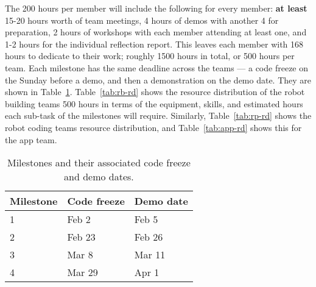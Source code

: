 \documentclass{article}
\begin{document}
The 200 hours per member will include the following for every member: {\bf at least} 15-20 hours worth of team meetings, 4 hours of demos with another 4 for preparation, 2 hours of workshops with each member attending at least one, and 1-2 hours for the individual reflection report. This leaves each member with 168 hours to dedicate to their work; roughly 1500 hours in total, or 500 hours per team. Each milestone has the same deadline across the teams --- a code freeze on the Sunday before a demo, and then a demonstration on the demo date. They are shown in Table~\ref{tab:demo-dates}. Table~\ref{tab:rb-rd} shows the resource distribution of the robot building teams 500 hours in terms of the equipment, skills, and estimated hours each sub-task of the milestones will require. Similarly, Table~\ref{tab:rp-rd} shows the robot coding teams resource distribution, and Table~\ref{tab:app-rd} shows this for the app team.
\begin{table}[]
  \begin{center}
  \begin{tabular}{lll}
    \hline
    Milestone & Code freeze & Demo date \\
    \hline
    1 & Feb 2 & Feb 5 \\
    2 & Feb 23 & Feb 26 \\
    3 & Mar 8 & Mar 11 \\
    4 & Mar 29 & Apr 1 \\
    \hline
  \end{tabular}
  \end{center}
  \caption{Milestones and their associated code freeze and demo dates.}
  \label{tab:demo-dates}
\end{table}
\end{document}
